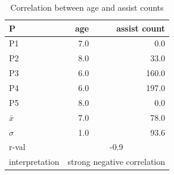\begin{table}[H]
\centering
\label{C1}
\caption{Correlation between age and assist counts}
\begin{tabular}{lrr}
\hline \hline
 P   & age & assist count \\ \hline
P1             & 7.0                        & 0.0                                     \\ \hline
P2             & 8.0                        & 33.0                                    \\ \hline
P3             & 6.0                        & 160.0                                   \\ \hline
P4             & 6.0                        & 197.0                                   \\ \hline
P5             & 8.0                        & 0.0                                     \\ \hline
$\bar{x}$             & 7.0                        & 78.0                                    \\ \hline
$\sigma$             & 1.0                        & 93.6                                \\ \hline
r-val          & \multicolumn{2}{c}{-0.9}                                        \\ \hline
interpretation & \multicolumn{2}{c}{strong negative correlation}                 \\ \hline \hline
\end{tabular}
\end{table}


